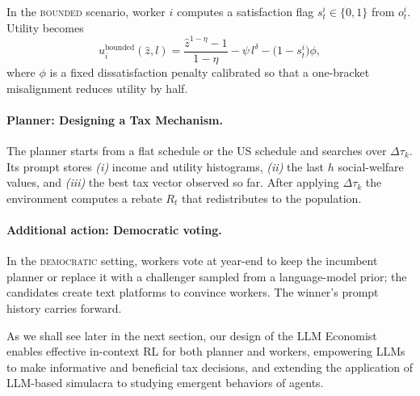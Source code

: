 In the \textsc{bounded} scenario, worker \(i\) computes a satisfaction flag \(s_t^i\in\{0,1\}\) from \(o_t^i\).  Utility becomes
\begin{equation}\label{eq:bounded}
    u_i^{\text{bounded}}(\hat z,l)=
\frac{\hat z^{1-\eta}-1}{1-\eta}-\psi\,l^{\delta}
-\bigl(1-s_t^i\bigr)\phi,
\end{equation}
where \(\phi\) is a fixed dissatisfaction penalty calibrated so that a one-bracket misalignment reduces utility by half.

\paragraph{Planner: Designing a Tax Mechanism.}
The planner starts from a flat schedule or the US schedule and searches over \(\Delta\tau_k\).  Its prompt stores \textit{(i)} income and utility histograms, \textit{(ii)} the last \(h\) social-welfare values, and \textit{(iii)} the best tax vector observed so far.   After applying \(\Delta\tau_k\) the environment computes a rebate \(R_t\) that redistributes to the population.

\paragraph{Additional action: Democratic voting.} 
In the \textsc{democratic} setting, workers vote at year-end to keep the incumbent planner or replace it with a challenger sampled from a language-model prior; the candidates create text platforms to convince workers. The winner’s prompt history carries forward.


As we shall see later in the next section, our design of the LLM Economist enables effective in-context RL for both planner and workers, empowering LLMs to make informative and beneficial tax decisions, and extending the application of LLM-based simulacra to studying emergent behaviors of agents.
